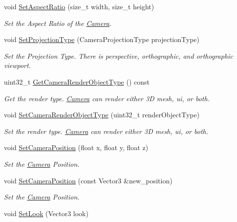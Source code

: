 \begin{DoxyCompactItemize}
void \hyperlink{classCamera_a8144951dd9ddd5557176e677fdfac282}{Set\+Aspect\+Ratio} (size\+\_\+t width, size\+\_\+t height)
\begin{DoxyCompactList}\small\item\em Set the Aspect Ratio of the \hyperlink{classCamera}{Camera}. \end{DoxyCompactList}\item 
void \hyperlink{classCamera_a8757dff50ae7715a05cb24596e008021}{Set\+Projection\+Type} (Camera\+Projection\+Type projection\+Type)
\begin{DoxyCompactList}\small\item\em Set the Projection Type. There is perspective, orthographic, and orthographic viewport. \end{DoxyCompactList}\item 
uint32\+\_\+t \hyperlink{classCamera_aa2ae7a317fca3bf2278d83317251860d}{Get\+Camera\+Render\+Object\+Type} () const
\begin{DoxyCompactList}\small\item\em Get the render type. \hyperlink{classCamera}{Camera} can render either 3D mesh, ui, or both. \end{DoxyCompactList}\item 
void \hyperlink{classCamera_a084b1b5028ff915b0f30734c4fcb7ac7}{Set\+Camera\+Render\+Object\+Type} (uint32\+\_\+t render\+Object\+Type)
\begin{DoxyCompactList}\small\item\em Set the render type. \hyperlink{classCamera}{Camera} can render either 3D mesh, ui, or both. \end{DoxyCompactList}\item 
void \hyperlink{classCamera_a83ffec8a5dfac0fa1ca1ea6388035dca}{Set\+Camera\+Position} (float x, float y, float z)
\begin{DoxyCompactList}\small\item\em Set the \hyperlink{classCamera}{Camera} Position. \end{DoxyCompactList}\item 
void \hyperlink{classCamera_a3a2df84800e210c35c8282b0f1022dac}{Set\+Camera\+Position} (const Vector3 \&new\+\_\+position)
\begin{DoxyCompactList}\small\item\em Set the \hyperlink{classCamera}{Camera} Position. \end{DoxyCompactList}\item 
void \hyperlink{classCamera_a71d00531ecb1f5cd9f3402bc3f1a4f30}{Set\+Look} (Vector3 look)

\end{DoxyCompactItemize}
